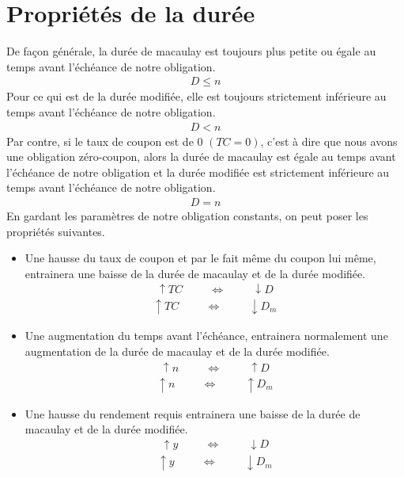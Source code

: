 \documentclass[letterpaper, 12pt]{article}
\newcommand{\1}{\mathds{1}}	%
\theoremstyle{definition}
\begin{document}
\section{Propriétés de la durée}
De façon générale,  la durée de macaulay est toujours plus petite ou égale au temps avant l'échéance de notre obligation. 
\begin{align*}
D \le n
\end{align*}
Pour ce qui est de la durée modifiée, elle est toujours strictement inférieure au temps avant l'échéance de notre obligation. 
\begin{align*}
D < n 
\end{align*}
Par contre, si le taux de coupon est de 0 $(TC=0)$,  c'est à dire que nous avons une obligation zéro-coupon, alors la durée de macaulay  est égale au temps avant l'échéance de notre obligation et la durée modifiée est strictement inférieure au temps avant l'échéance de notre obligation.
\begin{align*}
D=n 
\end{align*}
En gardant les paramètres de notre obligation constants,  on peut poser les propriétés suivantes.
\begin{itemize}
\item Une hausse du taux de coupon et par le fait même du coupon lui même, entrainera une baisse de la durée de macaulay et de la durée modifiée.
\begin{align*}
\uparrow TC \hspace{1cm} \Longleftrightarrow \hspace{1cm} \downarrow D 
\end{align*}
\begin{align*}
\uparrow TC \hspace{1cm} \Longleftrightarrow \hspace{1cm} \downarrow D_m 
\end{align*}
\item Une augmentation du temps avant l'échéance, entrainera normalement une augmentation de la durée de macaulay et de la durée modifiée.
\begin{align*}
\uparrow n \hspace{1cm} \Longleftrightarrow \hspace{1cm} \uparrow D 
\end{align*}
\begin{align*}
\uparrow n \hspace{1cm} \Longleftrightarrow \hspace{1cm} \uparrow D_m 
\end{align*}
\item Une hausse du rendement requis entrainera une baisse de la durée de macaulay et de la durée modifiée.
\begin{align*}
\uparrow y \hspace{1cm} \Longleftrightarrow \hspace{1cm} \downarrow D 
\end{align*}
\begin{align*}
\uparrow y \hspace{1cm} \Longleftrightarrow \hspace{1cm} \downarrow D_m 
\end{align*}
\end{itemize}
\end{document}
